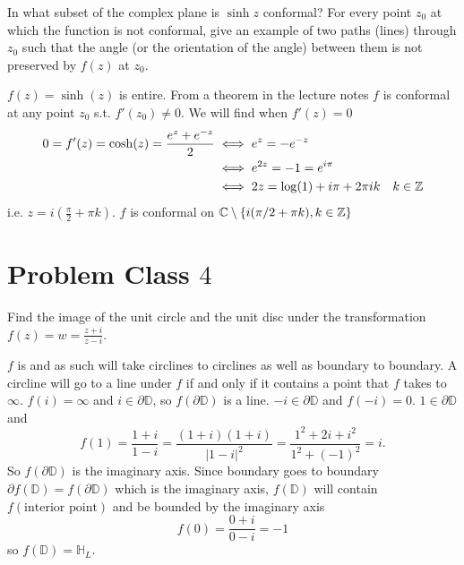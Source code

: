 \documentclass[10pt, a4paper]{article}
\begin{document}
\begin{problem}
    In what subset of the complex plane is $\sinh{z}$ conformal?
    For every point $z_0$ at which the function is not conformal,
    give an example of two paths
    (lines)
    through $z_0$ such that the angle
    (or the orientation of the angle)
    between them is not preserved by $f(z)$ at $z_0$.

    \begin{solution}
        $f(z) = \sinh(z)$ is entire.
        From a theorem in the lecture notes $f$ is conformal at any point $z_0$ s.t. $f'(z_0) \neq 0$.
        We will find when $f'(z) = 0$
        \begin{align*}
            0 = f'(z) = \cosh(z) = \frac{e ^ z + e ^ {-z}}{2} &\iff e ^ z = -e ^ {-z} \\
            &\iff e ^ {2z} = -1 = e ^ {i\pi} \\
            &\iff 2z = \log(1) + i\pi + 2\pi i k\quad k \in \mathbb{Z}
        \end{align*}
        i.e. $z = i\left(\frac{\pi}{2} + \pi k\right)$.
        $f$ is conformal on $\mathbb{C} \setminus \{i(\pi / 2 + \pi k), k \in \mathbb{Z}\}$
    \end{solution}
\end{problem}

\newpage

\section{Problem Class \texorpdfstring{$4$}{}}

\begin{problem}
    Find the image of the unit circle and the unit disc under the \mobius transformation $f(z) = w = \frac{z + i}{z - i}$.

    \begin{solution}
        $f$ is \mobius and as such will take circlines to circlines as well as boundary to boundary.
        A circline will go to a line under $f$ if and only if it contains a point that $f$ takes to $\infty$.
        $f(i) = \infty$ and $i \in \partial \mathbb{D}$,
        so $f(\partial \mathbb{D})$ is a line.
        $-i \in \partial \mathbb{D}$ and $f(-i) = 0$.
        $1 \in \partial \mathbb{D}$ and
        \[
        f(1) = \frac{1 + i}{1 - i} = \frac{(1 + i)(1 + i)}{|1 - i| ^ 2} = \frac{1 ^ 2+ 2i + i ^ 2}{1 ^ 2 + (-1) ^ 2} = i.
        \]
        So $f(\partial \mathbb{D})$ is the imaginary axis.
        Since boundary goes to boundary $\partial f(\mathbb{D}) = f(\partial \mathbb{D})$ which is the imaginary axis,
        $f(\mathbb{D})$ will contain $f(\text{interior point})$ and be bounded by the imaginary axis
        \[
        f(0) = \frac{0 + i}{0 - i} = -1
        \]
        so $f(\mathbb{D}) = \mathbb{H}_L$.
    \end{solution}
\end{problem}
\end{document}
